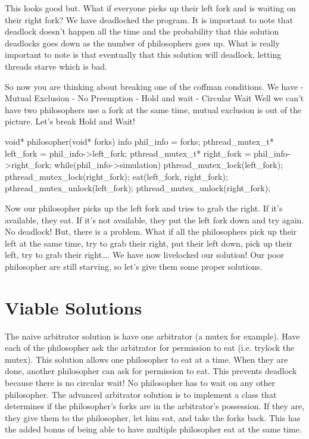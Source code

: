 This looks good but. What if everyone picks up their left fork and is waiting on their right fork? We have deadlocked the program. It is important to note that deadlock doesn't happen all the time and the probability that this solution deadlocks goes down as the number of philosophers goes up. What is really important to note is that eventually that this solution will deadlock, letting threads starve which is bad.


So now you are thinking about breaking one of the coffman conditions. We have - Mutual Exclusion - No Preemption - Hold and wait - Circular Wait Well we can't have two philosophers use a fork at the same time, mutual exclusion is out of the picture. Let's break Hold and Wait!

\begin{code}[language=C]
void* philosopher(void* forks){
     info phil_info = forks;
     pthread_mutex_t* left_fork = phil_info->left_fork;
     pthread_mutex_t* right_fork = phil_info->right_fork;
     while(phil_info->simulation){
          pthread_mutex_lock(left_fork);
          pthread_mutex_lock(right_fork);
          eat(left_fork, right_fork);
          pthread_mutex_unlock(left_fork);
          pthread_mutex_unlock(right_fork);
     }
}
\end{code}

Now our philosopher picks up the left fork and tries to grab the right. If it's available, they eat. If it's not available, they put the left fork down and try again. No deadlock! But, there is a problem. What if all the philosophers pick up their left at the same time, try to grab their right, put their left down, pick up their left, try to grab their right\ldots{}. We have now livelocked our solution! Our poor philosopher are still starving, so let's give them some proper solutions.

\section{Viable Solutions}

The naive arbitrator solution is have one arbitrator (a mutex for example). Have each of the philosopher ask the arbitrator for permission to eat (i.e. trylock the mutex). This solution allows one philosopher to eat at a time. When they are done, another philosopher can ask for permission to eat. This prevents deadlock because there is no circular wait! No philosopher has to wait on any other philosopher. The advanced arbitrator solution is to implement a class that determines if the philosopher's forks are in the arbitrator's possession. If they are, they give them to the philosopher, let him eat, and take the forks back. This has the added bonus of being able to have multiple philosopher eat at the same time.

